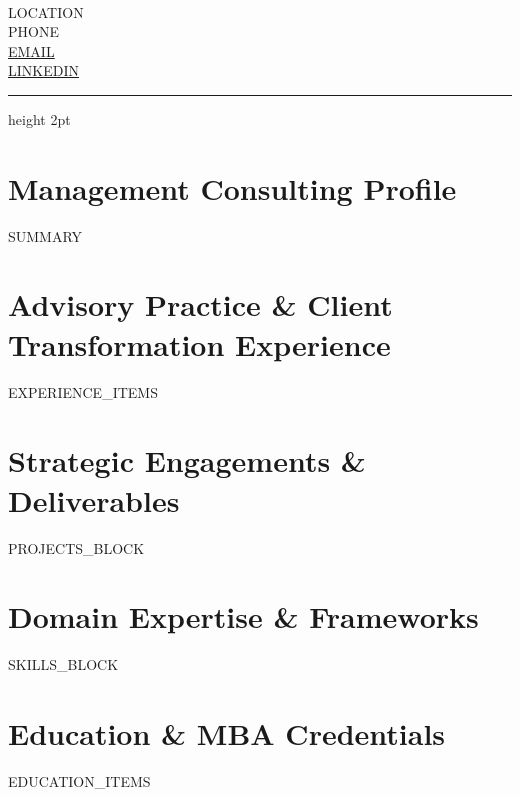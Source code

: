 \documentclass[10pt,letterpaper]{article}
\begin{document}
\begin{minipage}[b]{0.68\textwidth}
  {\Huge \textbf{}} \\[3pt]
  {\normalsize \textbf{}}
\end{minipage}
\hfill
\begin{minipage}[b]{0.30\textwidth}
  \raggedleft \small
  {{LOCATION}} \\
  {{PHONE}} \\
  \href{mailto:{{EMAIL}}}{{{EMAIL}}} \\
  \href{https://{{LINKEDIN}}}{{{LINKEDIN}}}
\end{minipage}

\vspace{6pt}
{\color{consultnavy}\hrule height 2pt}
\vspace{6pt}

\section{Management Consulting Profile}
\small
{{SUMMARY}}

\section{Advisory Practice \& Client Transformation Experience}
\small
{{EXPERIENCE_ITEMS}}

\section{Strategic Engagements \& Deliverables}
\small
{{PROJECTS_BLOCK}}

\section{Domain Expertise \& Frameworks}
\small
{{SKILLS_BLOCK}}

\section{Education \& MBA Credentials}
\small
{{EDUCATION_ITEMS}}
\end{document}
